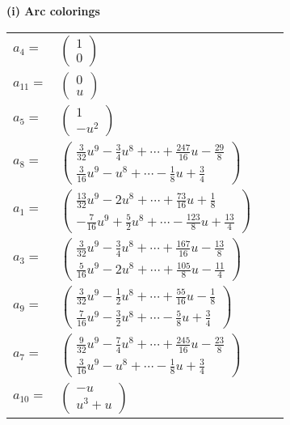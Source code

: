 \documentclass[1p]{elsarticle_modified}
\theoremstyle{definition}
\begin{document}
\flushleft \textbf{(i) Arc colorings}\\
\begin{tabular}{m{7pt} m{180pt} m{7pt} m{180pt} }
\flushright $a_{4}=$&$\begin{pmatrix}1\\0\end{pmatrix}$ \\
\flushright $a_{11}=$&$\begin{pmatrix}0\\u\end{pmatrix}$ \\
\flushright $a_{5}=$&$\begin{pmatrix}1\\- u^2\end{pmatrix}$ \\
\flushright $a_{8}=$&$\begin{pmatrix}\frac{3}{32} u^9-\frac{3}{4} u^8+\cdots+\frac{247}{16} u-\frac{29}{8}\\\frac{3}{16} u^9- u^8+\cdots-\frac{1}{8} u+\frac{3}{4}\end{pmatrix}$ \\
\flushright $a_{1}=$&$\begin{pmatrix}\frac{13}{32} u^9-2 u^8+\cdots+\frac{73}{16} u+\frac{1}{8}\\-\frac{7}{16} u^9+\frac{5}{2} u^8+\cdots-\frac{123}{8} u+\frac{13}{4}\end{pmatrix}$ \\
\flushright $a_{3}=$&$\begin{pmatrix}\frac{3}{32} u^9-\frac{3}{4} u^8+\cdots+\frac{167}{16} u-\frac{13}{8}\\\frac{5}{16} u^9-2 u^8+\cdots+\frac{105}{8} u-\frac{11}{4}\end{pmatrix}$ \\
\flushright $a_{9}=$&$\begin{pmatrix}\frac{3}{32} u^9-\frac{1}{2} u^8+\cdots+\frac{55}{16} u-\frac{1}{8}\\\frac{7}{16} u^9-\frac{3}{2} u^8+\cdots-\frac{5}{8} u+\frac{3}{4}\end{pmatrix}$ \\
\flushright $a_{7}=$&$\begin{pmatrix}\frac{9}{32} u^9-\frac{7}{4} u^8+\cdots+\frac{245}{16} u-\frac{23}{8}\\\frac{3}{16} u^9- u^8+\cdots-\frac{1}{8} u+\frac{3}{4}\end{pmatrix}$ \\
\flushright $a_{10}=$&$\begin{pmatrix}- u\\u^3+u\end{pmatrix}$ \\

\end{tabular}
\end{document}

